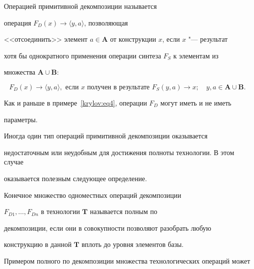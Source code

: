 \smallskip



\begin{definition}[3] Операцией примитивной декомпозиции называется

операция $F_{D}(x)\to \langle y, a \rangle$, позволяющая

<<отсоединить>> элемент $a \in \mathbf{A}$ от конструкции $x$, если $x$ "--- результат

хотя бы однократного применения операции синтеза $F_{S}$ к элементам из

множества $\mathbf{A} \cup \mathbf{B}$:

$$

F_{D}(x) \to \langle y, a \rangle, \,\, \text{если} \,\, x  \,\, \text{получен в результате} \,\,

F_S(y, a) \to x; \quad y, a\in \mathbf{A} \cup \mathbf{B}.

$$

\end{definition}



\smallskip



Как и раньше в примере~\eqref{krylov:eq4}, операции $F_D$ могут иметь и не иметь

параметры.



Иногда один тип операций примитивной декомпозиции оказывается

недостаточным или неудобным для достижения полноты технологии. В этом случае

оказывается полезным следующее определение.



\smallskip



\begin{definition}[4]Конечное множество одноместных операций декомпозиции

$F_{D1},\ldots,F_{Dn}$ в технологии $\mathbf{T}$ называется полным по

декомпозиции, если они в совокупности позволяют разобрать любую

конструкцию в данной $\mathbf{T}$ вплоть до уровня элементов базы.

\end{definition}



\smallskip



Примером полного по декомпозиции множества технологических операций может

